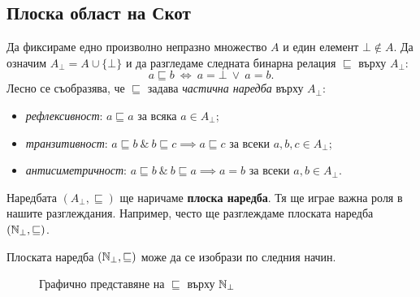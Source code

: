 \subsection{Плоска област на Скот}


Да фиксираме едно произволно непразно множество $A$ и един елемент $\bot \not \in A$.
Да означим $A_\bot = A \cup \{\bot\}$ и да разгледаме следната бинарна релация $\sqsubseteq$ върху $A_\bot$:
\[a \sqsubseteq b\ \iff\ a = \bot\ \vee\ a = b.\]
Лесно се съобразява, че $\sqsubseteq$ задава {\em частична наредба} върху $A_\bot$:
\begin{itemize}
\item 
  {\em рефлексивност}: $a \sqsubseteq a$ за всяка $a \in A_\bot$;
\item
  {\em транзитивност}: $a \sqsubseteq b\ \&\ b \sqsubseteq c \implies a\sqsubseteq c$ за всеки $a,b,c \in A_\bot$;
\item
  {\em антисиметричност}: $a \sqsubseteq b\ \&\ b\sqsubseteq a \implies a = b$ за всеки $a,b \in A_\bot$.
\end{itemize}

Наредбата $(A_\bot, \sqsubseteq)$ ще наричаме {\bf плоска наредба}. Тя ще играе важна роля в нашите разглеждания.
Например, често ще разглеждаме плоската наредба $(\mathbb{N}_\bot, \sqsubseteq)$.

\begin{example}
  Плоската наредба $(\mathbb{N}_\bot, \sqsubseteq)$ може да се изобрази по следния начин.
  \begin{framed}
  \begin{figure}[H]
    \label{fig:flat-nat-1}
    \centering
    \caption{Графично представяне на $\sqsubseteq$ върху $\mathbb{N}_\bot$}
  \end{figure}
  \end{framed}
\end{example}

